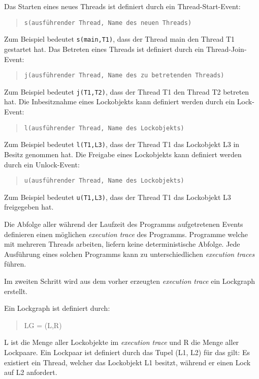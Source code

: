 Das Starten eines neues Threads ist definiert durch ein Thread-Start-Event:
\begin{quote}
\texttt{s(ausführender Thread, Name des neuen Threads)}\autocite[vgl.][212]{bensalem2005dynamic}
\end{quote}
Zum Beispiel bedeutet \texttt{s(main,T1)}, dass der Thread \textrm{main} den
Thread \textrm{T1} gestartet hat. Das Betreten eines Threads ist definiert durch
ein Thread-Join-Event:
\begin{quote}
\texttt{j(ausführender Thread, Name des zu betretenden Threads)}\autocite[vgl.][212]{bensalem2005dynamic}
\end{quote}
Zum Beispiel bedeutet \texttt{j(T1,T2)}, dass der Thread \textrm{T1} den Thread
\textrm{T2} betreten hat. Die Inbesitznahme eines Lockobjekts kann definiert
werden durch ein Lock-Event:
\begin{quote}
\texttt{l(ausführender Thread, Name des Lockobjekts)}\autocite[vgl.][212]{bensalem2005dynamic}
\end{quote}
Zum Beispiel bedeutet \texttt{l(T1,L3)}, dass der Thread \textrm{T1} das
Lockobjekt \textrm{L3} in Besitz genommen hat. Die Freigabe eines Lockobjekts
kann definiert werden durch ein Unlock-Event:
\begin{quote}
\texttt{u(ausführender Thread, Name des Lockobjekts)}\autocite[vgl.][212]{bensalem2005dynamic}
\end{quote}
Zum Beispiel bedeutet \texttt{u(T1,L3)}, dass der Thread \textrm{T1} das
Lockobjekt \textrm{L3} freigegeben hat.

Die Abfolge aller während der Laufzeit des Programms aufgetretenen Events
definieren einen möglichen \emph{execution trace} des Programms. Programme
welche mit mehreren Threads arbeiten, liefern keine deterministische Abfolge.
Jede Ausführung eines solchen Programms kann zu unterschiedlichen
\emph{execution traces} führen. 

Im zweiten Schritt wird aus dem vorher erzeugten \emph{execution trace} ein
Lockgraph erstellt.

\begin{samepage}
  Ein Lockgraph ist definiert durch:
  \begin{quote}
  \textrm{LG = (L,R)}
  \end{quote}
\end{samepage}
\textrm{L} ist die Menge aller Lockobjekte im \emph{execution trace} und \textrm{R}
die Menge aller Lockpaare. Ein Lockpaar ist definiert durch das Tupel
\textrm{(L1, L2)} für das gilt: Es existiert ein Thread, welcher das Lockobjekt
\textrm{L1} besitzt, während er einen Lock auf \textrm{L2}
anfordert.\autocite[vgl.][72]{coffman1971system}\autocite[vgl.][213]{bensalem2005dynamic}

